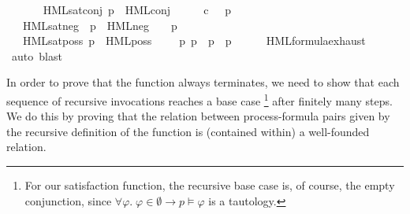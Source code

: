 \begin{isabellebody}
\ \ \isanewline
\ \ \ \ HML{\isacharunderscore}{\kern0pt}sat{\isacharunderscore}{\kern0pt}conj{\isacharcolon}{\kern0pt}\ {\isacartoucheopen}{\isacharparenleft}{\kern0pt}p\ {\isasymTurnstile}\ HML{\isacharunderscore}{\kern0pt}conj\ {\isasymPhi}{\isacharparenright}{\kern0pt}\ {\isacharequal}{\kern0pt}\ {\isacharparenleft}{\kern0pt}{\isasymforall}\ {\isasymphi}{\isachardot}{\kern0pt}\ {\isasymphi}\ {\isasymin}\isactrlsub c\ {\isasymPhi}\ {\isasymlongrightarrow}\ p\ {\isasymTurnstile}\ {\isasymphi}{\isacharparenright}{\kern0pt}{\isacartoucheclose}\ \isanewline
\ \ {\isacharbar}{\kern0pt}\ HML{\isacharunderscore}{\kern0pt}sat{\isacharunderscore}{\kern0pt}neg{\isacharcolon}{\kern0pt}\ \ {\isacartoucheopen}{\isacharparenleft}{\kern0pt}p\ {\isasymTurnstile}\ HML{\isacharunderscore}{\kern0pt}neg\ {\isasymphi}{\isacharparenright}{\kern0pt}\ {\isacharequal}{\kern0pt}\ {\isacharparenleft}{\kern0pt}{\isasymnot}\ p\ {\isasymTurnstile}\ {\isasymphi}{\isacharparenright}{\kern0pt}{\isacartoucheclose}\ \isanewline
\ \ {\isacharbar}{\kern0pt}\ HML{\isacharunderscore}{\kern0pt}sat{\isacharunderscore}{\kern0pt}poss{\isacharcolon}{\kern0pt}\ {\isacartoucheopen}{\isacharparenleft}{\kern0pt}p\ {\isasymTurnstile}\ HML{\isacharunderscore}{\kern0pt}poss\ {\isasymalpha}\ {\isasymphi}{\isacharparenright}{\kern0pt}\ {\isacharequal}{\kern0pt}\ {\isacharparenleft}{\kern0pt}{\isasymexists}\ p{\isacharprime}{\kern0pt}{\isachardot}{\kern0pt}\ p\ {\isasymlongmapsto}{\isasymalpha}\ p{\isacharprime}{\kern0pt}\ {\isasymand}\ p{\isacharprime}{\kern0pt}\ {\isasymTurnstile}\ {\isasymphi}{\isacharparenright}{\kern0pt}{\isacartoucheclose}\isanewline
%
\isadelimproof
\ \ %
\endisadelimproof
%
\isatagproof
{}\isamarkupfalse%
\ HML{\isacharunderscore}{\kern0pt}formula{\isachardot}{\kern0pt}exhaust\ \isamarkupfalse%
\ {\isacharparenleft}{\kern0pt}auto{\isacharcomma}{\kern0pt}\ blast{\isacharparenright}{\kern0pt}%
\endisatagproof
{\isafoldproof}%
%
\isadelimproof
%
\endisadelimproof
%
\begin{isamarkuptext}%
In order to prove that the function always terminates, we need to show that each sequence of recursive invocations reaches a base case%
\footnote{For our satisfaction function, the recursive base case is, of course, the empty conjunction, since
$\forall\varphi.\; \varphi \in \emptyset \longrightarrow p \vDash \varphi$
is a tautology.}
after finitely many steps. We do this by proving that the relation between process-formula pairs given by the recursive definition of the function is (contained within) a well-founded relation.

\end{isamarkuptext}
\end{isabellebody}

